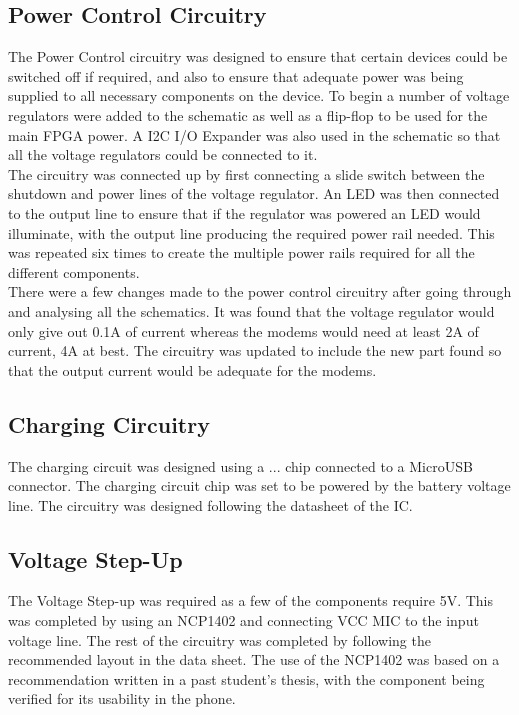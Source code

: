\subsection{Power Control Circuitry}
\label{chap:batt}
	The Power Control circuitry was designed to ensure that certain devices could be switched off if required, and also to ensure that adequate power was being supplied to all necessary components on the device. To begin a number of voltage regulators were added to the schematic as well as a flip-flop to be used for the main FPGA power. A I2C I/O Expander was also used in the schematic so that all the voltage regulators could be connected to it.\\

	The circuitry was connected up by first connecting a slide switch between the shutdown and power lines of the voltage regulator. An LED was then connected to the output line to ensure that if the regulator was powered an LED would illuminate, with the output line producing the required power rail needed. This was repeated six times to create the multiple power rails required for all the different components.\\

	There were a few changes made to the power control circuitry after going through and analysing all the schematics. It was found that the voltage regulator would only give out 0.1A of current whereas the modems would need at least 2A of current, 4A at best. The circuitry was updated to include the new part found so that the output current would be adequate for the modems. 

\subsection{Charging Circuitry}

	The charging circuit was designed using a ... chip connected to a MicroUSB connector. The charging circuit chip was set to be powered by the battery voltage line. The circuitry was designed following the datasheet of the IC.

\subsection{Voltage Step-Up}

	The Voltage Step-up was required as a few of the components require 5V. This was completed by using an NCP1402 and connecting VCC MIC to the input voltage line. The rest of the circuitry was completed by following the recommended layout in the data sheet. The use of the NCP1402 was based on a recommendation written in a past student's thesis, with the component being verified for its usability in the phone. 

